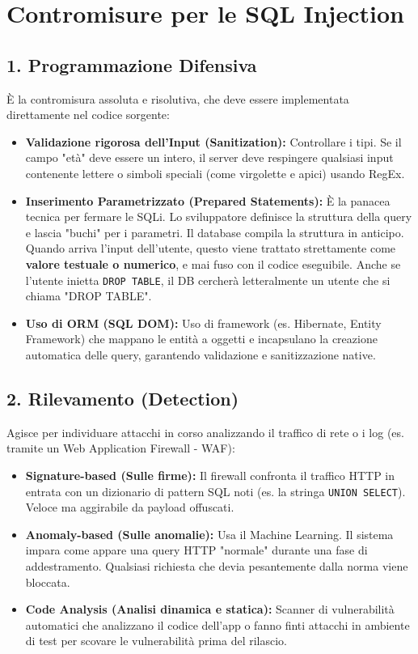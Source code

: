 \section{Contromisure per le SQL Injection}
\subsection{1. Programmazione Difensiva}
È la contromisura assoluta e risolutiva, che deve essere implementata direttamente nel codice sorgente:
\begin{itemize}
    \item \textbf{Validazione rigorosa dell'Input (Sanitization):} Controllare i tipi. Se il campo "età" deve essere un intero, il server deve respingere qualsiasi input contenente lettere o simboli speciali (come virgolette e apici) usando RegEx.
    \item \textbf{Inserimento Parametrizzato (Prepared Statements):} È la panacea tecnica per fermare le SQLi. Lo sviluppatore definisce la struttura della query e lascia "buchi" per i parametri. Il database compila la struttura in anticipo. Quando arriva l'input dell'utente, questo viene trattato strettamente come \textbf{valore testuale o numerico}, e mai fuso con il codice eseguibile. Anche se l'utente inietta \texttt{DROP TABLE}, il DB cercherà letteralmente un utente che si chiama "DROP TABLE".
    \item \textbf{Uso di ORM (SQL DOM):} Uso di framework (es. Hibernate, Entity Framework) che mappano le entità a oggetti e incapsulano la creazione automatica delle query, garantendo validazione e sanitizzazione native.
\end{itemize}

\newpage
\subsection{2. Rilevamento (Detection)}
Agisce per individuare attacchi in corso analizzando il traffico di rete o i log (es. tramite un Web Application Firewall - WAF):
\begin{itemize}
    \item \textbf{Signature-based (Sulle firme):} Il firewall confronta il traffico HTTP in entrata con un dizionario di pattern SQL noti (es. la stringa \texttt{UNION SELECT}). Veloce ma aggirabile da payload offuscati.
    \item \textbf{Anomaly-based (Sulle anomalie):} Usa il Machine Learning. Il sistema impara come appare una query HTTP "normale" durante una fase di addestramento. Qualsiasi richiesta che devia pesantemente dalla norma viene bloccata.
    \item \textbf{Code Analysis (Analisi dinamica e statica):} Scanner di vulnerabilità automatici che analizzano il codice dell'app o fanno finti attacchi in ambiente di test per scovare le vulnerabilità prima del rilascio.
\end{itemize}

